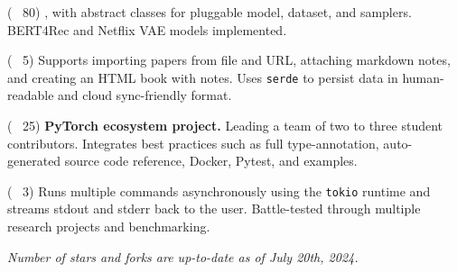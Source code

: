 
\begin{cvlist}

  \cvlistitem
    {\href{https://github.com/jaywonchung/BERT4Rec-VAE-Pytorch}{} 
    {\normalfont( \faCodeFork~80)}} %
    {, with abstract classes for pluggable model, dataset, and samplers. BERT4Rec and Netflix VAE models implemented.} %

  \cvlistitem
    {\href{https://github.com/jaywonchung/reason}{}
    {\normalfont( \faCodeFork~5)}} %
    { Supports importing papers from file and URL, attaching markdown notes, and creating an HTML book with notes. Uses \texttt{serde} to persist data in human-readable and cloud sync-friendly format.} %

  \cvlistitem
    {\href{https://github.com/SymbioticLab/Zeus}{}
    {\normalfont( \faCodeFork~25)}} %
    { \textbf{PyTorch ecosystem project.} Leading a team of two to three student contributors. Integrates best practices such as full type-annotation, auto-generated source code reference, Docker, Pytest, and examples.} %

  \cvlistitem
    {\href{https://github.com/jaywonchung/pegasus}{}
    {\normalfont( \faCodeFork~3)}} %
    { Runs multiple commands asynchronously using the \texttt{tokio} runtime and streams stdout and stderr back to the user. Battle-tested through multiple research projects and benchmarking.} %

\end{cvlist}

\vspace{-5mm}

\begin{cvparagraph}
\textit{Number of stars and forks are up-to-date as of July 20th, 2024.}
\end{cvparagraph}
